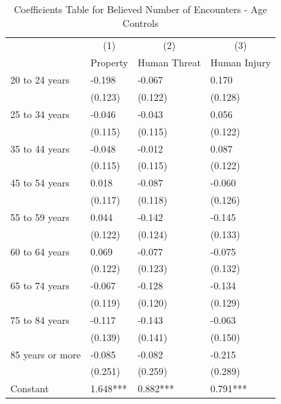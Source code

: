 \documentclass[english,12pt]{article}
\begin{document}
\begin{table}[H]
    \centering
    \caption{Coefficients Table for Believed Number of Encounters - Age Controls}
    \footnotesize
    \begin{tabular}{@{}llll@{}}
        \toprule
                           &\multicolumn{1}{c}{(1)}   &\multicolumn{1}{c}{(2)}   &\multicolumn{1}{c}{(3)}  \\
                           & Property & Human Threat & Human Injury \\ \midrule
        20 to 24 years&      -0.198   &      -0.067   &       0.170   \\
                    &     (0.123)   &     (0.122)   &     (0.128)   \\
        25 to 34 years&      -0.046   &      -0.043   &       0.056   \\
                    &     (0.115)   &     (0.115)   &     (0.122)   \\
        35 to 44 years&      -0.048   &      -0.012   &       0.087   \\
                    &     (0.115)   &     (0.115)   &     (0.122)   \\
        45 to 54 years&       0.018   &      -0.087   &      -0.060   \\
                    &     (0.117)   &     (0.118)   &     (0.126)   \\
        55 to 59 years&       0.044   &      -0.142   &      -0.145   \\
                    &     (0.122)   &     (0.124)   &     (0.133)   \\
        60 to 64 years&       0.069   &      -0.077   &      -0.075   \\
                    &     (0.122)   &     (0.123)   &     (0.132)   \\
        65 to 74 years&      -0.067   &      -0.128   &      -0.134   \\
                    &     (0.119)   &     (0.120)   &     (0.129)   \\
        75 to 84 years&      -0.117   &      -0.143   &      -0.063   \\
                    &     (0.139)   &     (0.141)   &     (0.150)   \\
        85 years or more&      -0.085   &      -0.082   &      -0.215   \\
                    &     (0.251)   &     (0.259)   &     (0.289)   \\\midrule                       
        Constant    &       1.648***&       0.882***&       0.791***\\

\end{tabular}
\end{table}
\end{document}
